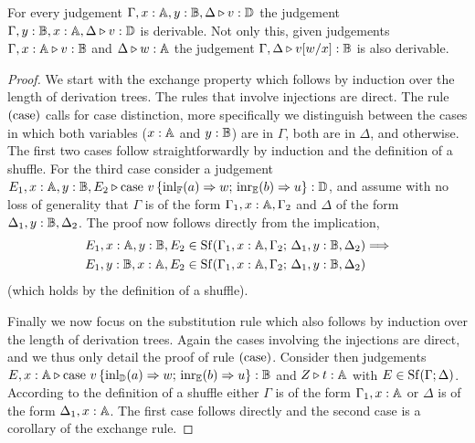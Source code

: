 \documentclass[a4paper,UKenglish,cleveref, autoref, thm-restate]{lipics-v2021}
\begin{document}
\begin{lemma}
\label{lem:exh_and_sub} 
For every judgement $\Gamma,x: \mathbb{A}, y: \mathbb{B}, \Delta \triangleright v: \mathbb{D}$ the
judgement $\Gamma, y:\mathbb{B}, x:\mathbb{A}, \Delta \triangleright v:
\mathbb{D}$ is derivable. Not only this, given judgements  $\Gamma,x:\mathbb{A} \triangleright
v: \mathbb{B}$ and $\Delta \triangleright w: \mathbb{A}$ the judgement $\Gamma, \Delta \triangleright
v[w/x]: \mathbb{B}$ is also derivable.
\end{lemma}


\begin{proof}
We start with the exchange property which follows by induction over the length
of derivation trees. The rules that involve injections are direct.  The rule
$(\mathrm{case})$ calls for case distinction, more specifically we  distinguish
between the cases in which both variables ($x : \mathbb{A}$ and $y : \mathbb{B}$) are
in $\Gamma$, both are in $\Delta$, and otherwise. The first two cases follow
straightforwardly by induction and the definition of a shuffle. For the third
case consider a judgement $E_1,x : \mathbb{A}, y : \mathbb{B}, E_2 \triangleright \text{case }
v\, \{\mathrm{inl}_{\mathbb{F}}(a) \Rightarrow w ; \, \mathrm{inr}_{\mathbb{E}}(b) \Rightarrow u \}:
\mathbb{D}$, and assume with no loss of generality that $\Gamma$ is of the form
$\Gamma_1, x : \mathbb{A}, \Gamma_2$ and $\Delta$ of the form $\Delta_1, y :
\mathbb{B}, \Delta_2$. The proof now follows directly from the implication,
\begin{align*}
        & E_1, x : \mathbb{A}, y : \mathbb{B}, E_2 \in \mathrm{Sf}(\Gamma_1, x : \mathbb{A}, \Gamma_2 ; \,
        \Delta_1, y : \mathbb{B}, \Delta_2)
        \Longrightarrow \\
        &E_1, y : \mathbb{B}, x : \mathbb{A}, E_2 \in \mathrm{Sf}(\Gamma_1, x : \mathbb{A}, \Gamma_2 ; \,
        \Delta_1, y : \mathbb{B}, \Delta_2)
\end{align*}
(which holds by the definition of a shuffle).

Finally we now focus on the substitution rule which also follows by induction over the
length of derivation trees. Again the cases involving the injections are direct,
and we thus only detail the proof of rule $(\mathrm{case})$. Consider then
judgements $E,x : \mathbb{A} \triangleright \text{case } v\, \{\mathrm{inl}_{\mathbb{D}}(a) \Rightarrow
w ; \, \mathrm{inr}_{\mathbb{E}}(b) \Rightarrow u \}: \mathbb{B}$ and
$Z \triangleright t : \mathbb{A}$ with $E \in \mathrm{Sf}(\Gamma; \Delta)$. According to the definition
of a shuffle either $\Gamma$ is of the form $\Gamma_1, x: \mathbb{A}$ or $\Delta$ is
of the form $\Delta_1, x : \mathbb{A}$. The first case follows directly and the second case
is a corollary of the exchange rule.
\end{proof}
\end{document}
